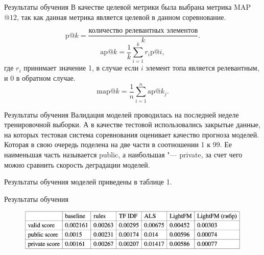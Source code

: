\documentclass{beamer}
\begin{document}
\begin{frame}{Результаты обучения}
  В качестве целевой метрики была выбрана метрика MAP$@12$, так как данная метрика является целевой в данном соревнование.

  \begin{equation}
    \text{p}@k = \frac{\text{количество релевантных элементов}}{k}.
  \end{equation}
  \begin{equation}
    \text{ap}@k = \frac{1}{k}\sum_{i=1}^{k}r_i\text{p}@i,
  \end{equation}
  где $r_i$ принимает значение 1, в случае если $i$ элемент топа является релевантным, и 0 в обратном случае.
  \begin{equation}
    \text{map}@k = \frac{1}{n}\sum_{i=1}^{n}\text{ap}@k_j.
  \end{equation}
\end{frame}

\begin{frame}{Результаты обучения}
  Валидация моделей проводилась на последней неделе тренировочной выборки. А в качестве тестовой использовались закрытые данные,
  на которых тестовая система соревнования оценивает качество прогноза моделей. Которая в свою очередь поделена на две части в
  соотношении 1 к 99. Ее наименьшая часть называется public, а наибольшая "--- private, за счет чего можно сравнить скорость
  деградации моделей.

  Результаты обучения моделей приведены в таблице 1.
\end{frame}

\begin{frame}{Результаты обучения}
  \begin{figure}[H]
    \centering
    \includegraphics[width=1.\textwidth]{pic/5}
    \label{fig:img1}
  \end{figure}
\end{frame}
\end{document}
